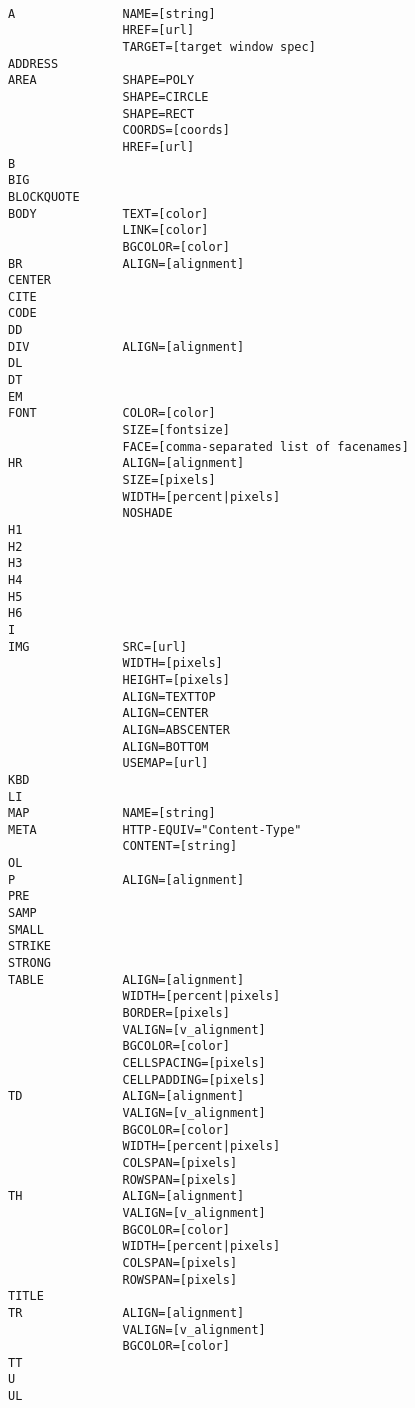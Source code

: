 \begin{verbatim}

A               NAME=[string]
                HREF=[url]
                TARGET=[target window spec]
ADDRESS
AREA            SHAPE=POLY
                SHAPE=CIRCLE
                SHAPE=RECT
                COORDS=[coords]
                HREF=[url]
B
BIG
BLOCKQUOTE
BODY            TEXT=[color]
                LINK=[color]
                BGCOLOR=[color]
BR              ALIGN=[alignment]
CENTER
CITE
CODE
DD
DIV             ALIGN=[alignment]
DL
DT
EM
FONT            COLOR=[color]
                SIZE=[fontsize]
                FACE=[comma-separated list of facenames]
HR              ALIGN=[alignment]
                SIZE=[pixels]
                WIDTH=[percent|pixels]
                NOSHADE
H1
H2
H3
H4
H5
H6
I
IMG             SRC=[url]
                WIDTH=[pixels]
                HEIGHT=[pixels]
                ALIGN=TEXTTOP
                ALIGN=CENTER
                ALIGN=ABSCENTER
                ALIGN=BOTTOM
                USEMAP=[url]
KBD
LI
MAP             NAME=[string]
META            HTTP-EQUIV="Content-Type"
                CONTENT=[string]
OL
P               ALIGN=[alignment]
PRE
SAMP
SMALL
STRIKE
STRONG
TABLE           ALIGN=[alignment]
                WIDTH=[percent|pixels]
                BORDER=[pixels]
                VALIGN=[v_alignment]
                BGCOLOR=[color]
                CELLSPACING=[pixels]
                CELLPADDING=[pixels]
TD              ALIGN=[alignment]
                VALIGN=[v_alignment]
                BGCOLOR=[color]
                WIDTH=[percent|pixels]
                COLSPAN=[pixels]
                ROWSPAN=[pixels]
TH              ALIGN=[alignment]
                VALIGN=[v_alignment]
                BGCOLOR=[color]
                WIDTH=[percent|pixels]
                COLSPAN=[pixels]
                ROWSPAN=[pixels]
TITLE
TR              ALIGN=[alignment]
                VALIGN=[v_alignment]
                BGCOLOR=[color]
TT
U
UL

\end{verbatim}

